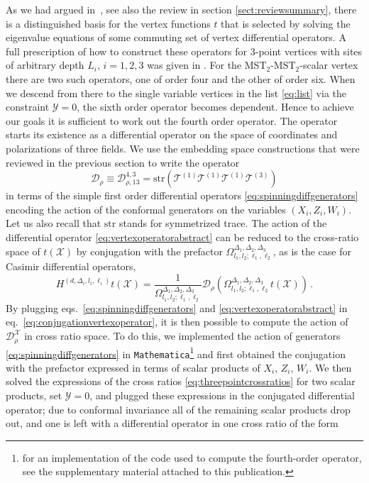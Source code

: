 \documentclass{article}
\begin{document}
As we had argued in~\cite{Buric:2020dyz,Buric:2021ywo}, see also the 
review in section \ref{sect:reviewsummary}, there is a distinguished basis for the 
vertex functions $t$ that is selected by solving the eigenvalue equations of some 
commuting set of vertex differential operators. A full prescription of how to construct 
these operators for 3-point vertices with sites of arbitrary depth $L_i$, 
$i=1,2,3$ was given in \cite{Buric:2021ywo}. For the MST$_2$-MST$_2$-scalar
vertex there are two such operators, one of order four and the other of order 
six. When we descend from there to the single variable vertices in the list 
\eqref{eq:list} via the constraint $\mathcal{Y}=0$, the sixth order operator 
becomes dependent. Hence to achieve our goals it is sufficient to work out 
the fourth order operator. The operator starts its existence as a differential 
operator on the space of coordinates and polarizations of three fields. We use the embedding space constructions that were reviewed in the previous 
section to write the operator 
\begin{equation}
    \mathcal{D}_\rho\equiv\mathcal{D}_{\rho,13}^{4,3}=\text{str}\left(\mathcal{T}^{(1)}\mathcal{T}^{(1)}\mathcal{T}^{(1)}\mathcal{T}^{(3)}\right)
    \label{eq:vertexoperatorabstract}
\end{equation}
in terms of the simple first order differential operators \eqref{eq:spinningdiffgenerators} encoding the action of the conformal 
generators on the variables $(X_i,Z_i,W_i)$. Let us also recall that 
$\text{str}$ stands for symmetrized trace. The action of the differential 
operator \eqref{eq:vertexoperatorabstract} can be reduced to the cross-ratio 
space of $t(\mathcal{X})$ by conjugation with the prefactor $\Omega^{\Delta_1,
\Delta_2,\Delta_3}_{l_1,l_2;\ell_1,\ell_2}$, as is the case for 
Casimir differential operators, 
\begin{equation}
    H^{(d,\Delta_i,l_i,\ell_i)} t(\mathcal{X})=
    \frac{1}{\Omega^{\Delta_1,\Delta_2,\Delta_3}_{l_1,l_2;\ell_1,\ell_2}}
    \mathcal{D}_\rho \left(\Omega^{\Delta_1,\Delta_2,\Delta_3}_{l_1,l_2;
    \ell_1,\ell_2} t(\mathcal{X})\right)\,.
    \label{eq:conjugationvertexoperator}
\end{equation}
By plugging eqs.\ \eqref{eq:spinningdiffgenerators} and \eqref{eq:vertexoperatorabstract} in eq.\ \eqref{eq:conjugationvertexoperator}, it 
is then possible to compute the action of $\mathcal{D}_\rho^{\mathcal{X}}$ in cross ratio space. To do this, we implemented the action of generators \eqref{eq:spinningdiffgenerators} in \texttt{Mathematica}\footnote{for an implementation of the code used to compute the fourth-order operator, see the supplementary material attached to this publication.} and first obtained the conjugation with the prefactor expressed in terms of scalar products of $X_i$, $Z_i$, $W_i$. We then solved the expressions of the cross ratios \eqref{eq:threepointcrossratios} for two scalar products, set $\mathcal{Y}=0$, and plugged these expressions in the conjugated differential operator; due to conformal invariance all of the remaining scalar products drop out, and one is left with a differential operator in one cross ratio of the form 
\end{document}
